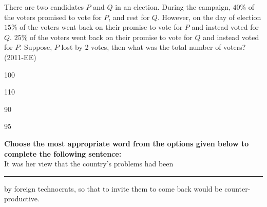 \item There are two candidates $P$ and $Q$ in an election. During the campaign, $40\%$ of the voters promised to vote for $P$, and rest for $Q$. However, on the day of election $15\%$ of the voters went back on their promise to vote for $P$ and instead voted for $Q$. $25\%$ of the voters went back on their promise to vote for $Q$ and instead voted for $P$. Suppose, $P$ lost by 2 votes, then what was the total number of voters? \hfill(2011-EE)
\begin{enumerate}
    \begin{multicols}{4}
        \item 100
        \item 110 
        \item 90 
        \item 95
    \end{multicols}
\end{enumerate}
\item \textbf{Choose the most appropriate word from the options given below to complete the following sentence:} \\
It was her view that the country's problems had been \rule{1.6cm}{0.5pt} by foreign technocrats, so that to invite them to come back would be counter-productive.

